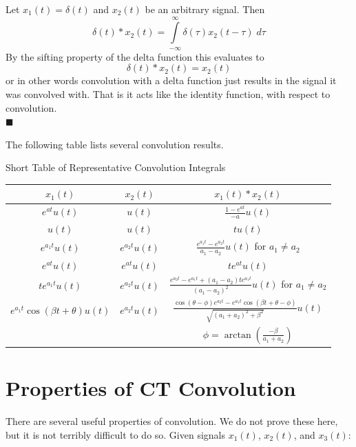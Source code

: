 \begin{example} Let $x_1(t) = \delta(t)$ and $x_2(t)$ be an arbitrary signal. Then
  \[
  \delta(t) * x_2(t) = \int\limits_{-\infty}^{\infty} \delta(\tau)x_2(t-\tau) \; d\tau
  \]
  By the sifting property of the delta function this evaluates to
  \[
  \delta(t) * x_2(t) = x_2(t)
  \]
  or in other words convolution with a delta function just results in the signal it was convolved with. That is it acts like the identity function, with respect to convolution.\\
  $\blacksquare$
\end{example}

The following table lists several convolution results.

\begin{center}
  Short Table of Representative Convolution Integrals
  \vspace{1em}
  
\bgroup
\def\arraystretch{2}
\setlength\tabcolsep{2em}
\begin{tabular}{|c|c|c|}
  \hline
  $x_1(t)$ & $x_2(t)$ & $x_1(t) * x_2(t)$\\
  \hline
  \hline
  $e^{a t}u(t)$ & $u(t)$ & $\frac{1-e^{a t}}{-a}u(t)$\\
  $u(t)$ & $u(t)$ & $tu(t)$\\
  $e^{a_1 t}u(t)$ & $e^{a_2 t}u(t)$ & $\frac{e^{a_1 t}-e^{a_2 t}}{a_1 - a_2}u(t)$ for $a_1 \neq a_2$\\
  $e^{a t}u(t)$ & $e^{a t}u(t)$ & $te^{a t}u(t)$\\
  $te^{a_1 t}u(t)$ & $e^{a_2 t}u(t)$ & $\frac{e^{a_2 t}-e^{a_1 t} + (a_1-a_2)te^{a_1 t}}{(a_1 - a_2)^2}u(t)$ for $a_1 \neq a_2$\\
  $e^{a_1 t}\cos(\beta t + \theta)u(t)$ & $e^{a_2 t}u(t)$ & $\frac{\cos(\theta - \phi)e^{a_2 t} - e^{a_1 t}\cos(\beta t + \theta - \phi)}{\sqrt{(a_1 + a_2)^2 + \beta^2}}u(t)$\\
  & & $\phi = \arctan\left( \frac{-\beta}{a_1 + a_2}\right)$\\
\hline                       
\end{tabular}
\egroup

\end{center}

\section{Properties of CT Convolution}
There are several useful properties of convolution. We do not prove these here, but it is not terribly difficult to do so. Given signals $x_1(t)$, $x_2(t)$, and $x_3(t)$:


